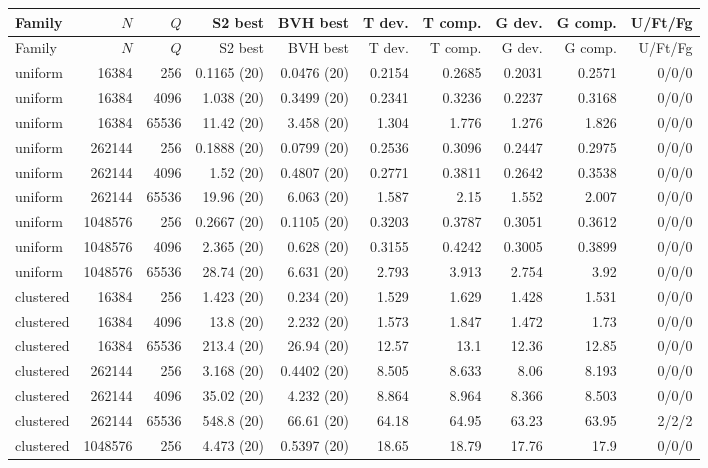 \begingroup
\scriptsize
\setlength{\tabcolsep}{2.5pt}
\renewcommand{\arraystretch}{1.16}
\begin{longtable}{lrrrrrrrrr}
\toprule
Family & $N$ & $Q$ & S2 best & BVH best & T dev. & T comp. & G dev. & G comp. & U/Ft/Fg \\
\midrule\endfirsthead
\toprule
Family & $N$ & $Q$ & S2 best & BVH best & T dev. & T comp. & G dev. & G comp. & U/Ft/Fg \\
\midrule\endhead
\bottomrule\endfoot
uniform & 16384 & 256 & 0.1165 (20) & 0.0476 (20) & 0.2154 & 0.2685 & 0.2031 & 0.2571 & 0/0/0 \\
uniform & 16384 & 4096 & 1.038 (20) & 0.3499 (20) & 0.2341 & 0.3236 & 0.2237 & 0.3168 & 0/0/0 \\
uniform & 16384 & 65536 & 11.42 (20) & 3.458 (20) & 1.304 & 1.776 & 1.276 & 1.826 & 0/0/0 \\
uniform & 262144 & 256 & 0.1888 (20) & 0.0799 (20) & 0.2536 & 0.3096 & 0.2447 & 0.2975 & 0/0/0 \\
uniform & 262144 & 4096 & 1.52 (20) & 0.4807 (20) & 0.2771 & 0.3811 & 0.2642 & 0.3538 & 0/0/0 \\
uniform & 262144 & 65536 & 19.96 (20) & 6.063 (20) & 1.587 & 2.15 & 1.552 & 2.007 & 0/0/0 \\
uniform & 1048576 & 256 & 0.2667 (20) & 0.1105 (20) & 0.3203 & 0.3787 & 0.3051 & 0.3612 & 0/0/0 \\
uniform & 1048576 & 4096 & 2.365 (20) & 0.628 (20) & 0.3155 & 0.4242 & 0.3005 & 0.3899 & 0/0/0 \\
uniform & 1048576 & 65536 & 28.74 (20) & 6.631 (20) & 2.793 & 3.913 & 2.754 & 3.92 & 0/0/0 \\
clustered & 16384 & 256 & 1.423 (20) & 0.234 (20) & 1.529 & 1.629 & 1.428 & 1.531 & 0/0/0 \\
clustered & 16384 & 4096 & 13.8 (20) & 2.232 (20) & 1.573 & 1.847 & 1.472 & 1.73 & 0/0/0 \\
clustered & 16384 & 65536 & 213.4 (20) & 26.94 (20) & 12.57 & 13.1 & 12.36 & 12.85 & 0/0/0 \\
clustered & 262144 & 256 & 3.168 (20) & 0.4402 (20) & 8.505 & 8.633 & 8.06 & 8.193 & 0/0/0 \\
clustered & 262144 & 4096 & 35.02 (20) & 4.232 (20) & 8.864 & 8.964 & 8.366 & 8.503 & 0/0/0 \\
clustered & 262144 & 65536 & 548.8 (20) & 66.61 (20) & 64.18 & 64.95 & 63.23 & 63.95 & 2/2/2 \\
clustered & 1048576 & 256 & 4.473 (20) & 0.5397 (20) & 18.65 & 18.79 & 17.76 & 17.9 & 0/0/0 \\

\end{longtable}
